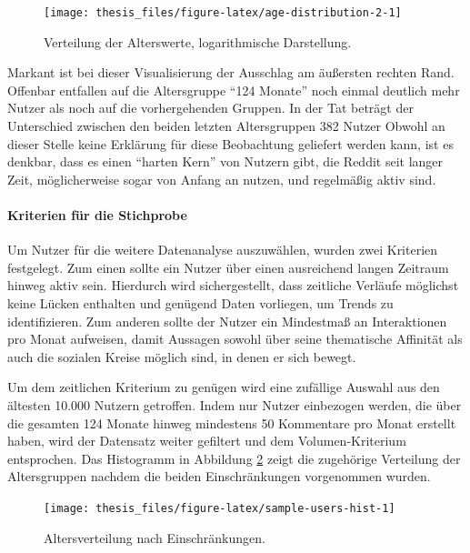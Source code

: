 \documentclass[11pt,a4paper,twoside]{article}
\let\oldpar\paragraph
\renewcommand{\paragraph}{\oldpar*}
\begin{document}
\begin{figure}

{\centering \texttt{[image: thesis\_files/figure-latex/age-distribution-2-1]} 

}

\caption{Verteilung der Alterswerte, logarithmische Darstellung.}\label{fig:age-distribution-2}
\end{figure}

Markant ist bei dieser Visualisierung der Ausschlag am äußersten rechten
Rand. Offenbar entfallen auf die Altersgruppe \enquote{124 Monate} noch
einmal deutlich mehr Nutzer als noch auf die vorhergehenden Gruppen. In
der Tat beträgt der Unterschied zwischen den beiden letzten
Altersgruppen 382 Nutzer Obwohl an dieser Stelle keine Erklärung für
diese Beobachtung geliefert werden kann, ist es denkbar, dass es einen
\enquote{harten Kern} von Nutzern gibt, die Reddit seit langer Zeit,
möglicherweise sogar von Anfang an nutzen, und regelmäßig aktiv sind.

\hypertarget{kriterien-fur-die-stichprobe}{%
\paragraph{Kriterien für die
Stichprobe}\label{kriterien-fur-die-stichprobe}}

Um Nutzer für die weitere Datenanalyse auszuwählen, wurden zwei
Kriterien festgelegt. Zum einen sollte ein Nutzer über einen ausreichend
langen Zeitraum hinweg aktiv sein. Hierdurch wird sichergestellt, dass
zeitliche Verläufe möglichst keine Lücken enthalten und genügend Daten
vorliegen, um Trends zu identifizieren. Zum anderen sollte der Nutzer
ein Mindestmaß an Interaktionen pro Monat aufweisen, damit Aussagen
sowohl über seine thematische Affinität als auch die sozialen Kreise
möglich sind, in denen er sich bewegt.

Um dem zeitlichen Kriterium zu genügen wird eine zufällige Auswahl aus
den ältesten 10.000 Nutzern getroffen. Indem nur Nutzer einbezogen
werden, die über die gesamten 124 Monate hinweg mindestens 50 Kommentare
pro Monat erstellt haben, wird der Datensatz weiter gefiltert und dem
Volumen-Kriterium entsprochen. Das Histogramm in Abbildung
\ref{fig:sample-users-hist} zeigt die zugehörige Verteilung der
Altersgruppen nachdem die beiden Einschränkungen vorgenommen wurden.

\begin{figure}

{\centering \texttt{[image: thesis\_files/figure-latex/sample-users-hist-1]} 

}

\caption{Altersverteilung nach Einschränkungen.}\label{fig:sample-users-hist}
\end{figure}
\end{document}
